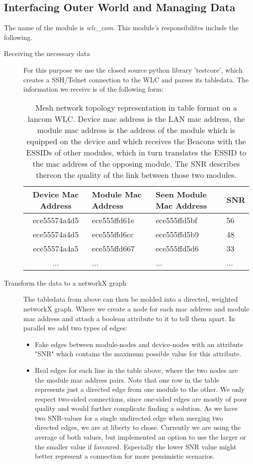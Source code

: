   \subsection{Interfacing Outer World and Managing Data}
    The name of the module is \textit{wlc\_com}. This module's responsibilites include the following.
    \begin{description}
    \item[Receiving the necessary data]
      For this purpose we use the closed source python library 'testcore', which creates a SSH/Telnet connection to the WLC and parses its tabledata.
      The information we receive is of the following form:
      \begin{table}[p]
	\begin{tabular}{clll}
	  Device Mac Address & Module Mac Address & Seen Module Mac Address & \ac{SNR}\\ \hline
	  ece55574a4d5 & ece555ffd61e & ece555ffd5bf & 56 \\
	  ece55574a4d5 & ece555ffd6cc & ece555ffd5b9 & 48 \\
	  ece55574a4a5 & ece555ffd667 & ece555ffd5d6 & 33 \\
	  ... & ... & ... & ...
	\end{tabular}
	\caption{Mesh network topology representation in table format on a lancom WLC. Device mac address is the LAN mac address, the module mac address is
	the address of the module which is equipped on the device and which receives the Beacons with the ESSIDs of other modules, which in turn translates
	the ESSID to the mac address of the opposing module. The \ac{SNR} describes thereon the quality of the link between those two modules.}
	\label{tab:wlc}
      \end{table}
      
      \item [Transform the data to a networkX graph]
	The tabledata from above can then be molded into a directed, weighted networkX graph. Where we create a node for each mac address and module mac address and attach a boolean
	attribute to it to tell them apart. 
	In parallel we add two types of edges:
      
	\begin{itemize}
	  \item Fake edges between module-nodes and device-nodes with an attribute "SNR" which contains the maximum possible value for this attribute.
	  
	  \item Real edges for each line in the table above, where the two nodes are the module mac address pairs. 
	    Note that one row in the table represents just a directed edge from one module to the other. We only respect two-sided connections,
	    since one-sided edges are mostly of poor quality and would further complicate finding a solution.
	    As we have two SNR-values for a single undirected edge when merging two directed edges, we are at liberty to chose.
	    Currently we are using the average of both values, but implemented an option to use the larger or the smaller value if favoured.
	    Especially the lower SNR value might better represent a connection for more pessimistic scenarios.
	\end{itemize}
      

\end{description}

